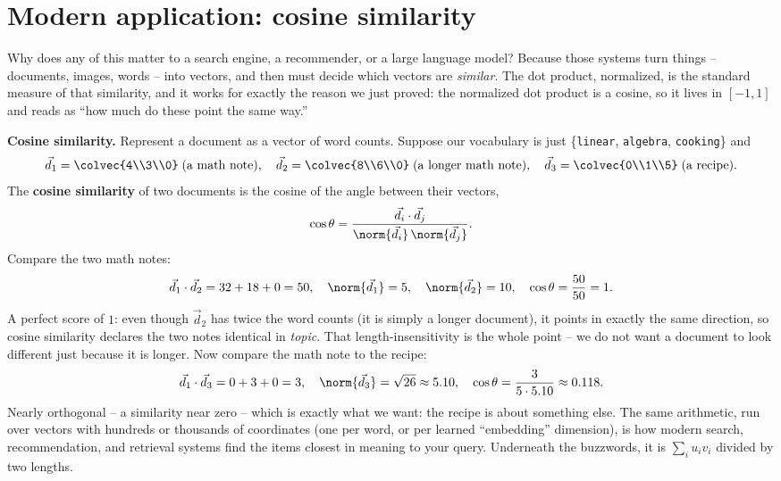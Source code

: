 \section{Modern application: cosine similarity}

Why does any of this matter to a search engine, a recommender, or a large language
model? Because those systems turn things -- documents, images, words -- into vectors,
and then must decide which vectors are \emph{similar}. The dot product, normalized,
is the standard measure of that similarity, and it works for exactly the reason we
just proved: the normalized dot product is a cosine, so it lives in $[-1,1]$ and
reads as ``how much do these point the same way.''

\begin{applicationbox}
\textbf{Cosine similarity.} Represent a document as a vector of word counts. Suppose
our vocabulary is just \{\texttt{linear}, \texttt{algebra}, \texttt{cooking}\} and
\[
  \vec d_1 = \colvec{4\\3\\0}\;(\text{a math note}),\quad
  \vec d_2 = \colvec{8\\6\\0}\;(\text{a longer math note}),\quad
  \vec d_3 = \colvec{0\\1\\5}\;(\text{a recipe}).
\]
The \textbf{cosine similarity} of two documents is the cosine of the angle between
their vectors,
\[
  \cos\theta = \frac{\vec d_i\cdot\vec d_j}{\norm{\vec d_i}\,\norm{\vec d_j}}.
\]
Compare the two math notes:
\[
  \vec d_1\cdot\vec d_2 = 32 + 18 + 0 = 50, \quad
  \norm{\vec d_1} = 5,\quad \norm{\vec d_2}=10,\quad
  \cos\theta = \frac{50}{50} = 1.
\]
A perfect score of $1$: even though $\vec d_2$ has twice the word counts (it is
simply a longer document), it points in exactly the same direction, so cosine
similarity declares the two notes identical in \emph{topic}. That
length-insensitivity is the whole point -- we do not want a document to look
different just because it is longer. Now compare the math note to the recipe:
\[
  \vec d_1\cdot\vec d_3 = 0 + 3 + 0 = 3,\quad
  \norm{\vec d_3} = \sqrt{26}\approx 5.10,\quad
  \cos\theta = \frac{3}{5\cdot 5.10}\approx 0.118.
\]
Nearly orthogonal -- a similarity near zero -- which is exactly what we want: the
recipe is about something else. The same arithmetic, run over vectors with hundreds
or thousands of coordinates (one per word, or per learned ``embedding'' dimension),
is how modern search, recommendation, and retrieval systems find the items closest in
meaning to your query. Underneath the buzzwords, it is $\sum_i u_iv_i$ divided by two
lengths.
\end{applicationbox}

